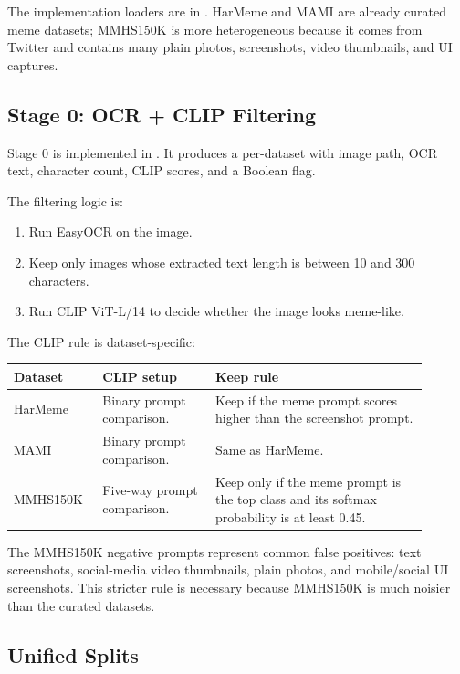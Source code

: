 \documentclass[11pt,a4paper]{article}
\newcommand{\code}[1]{\texttt{\detokenize{#1}}}
\begin{document}
The implementation loaders are in . HarMeme and MAMI are already curated meme datasets; MMHS150K is more heterogeneous because it comes from Twitter and contains many plain photos, screenshots, video thumbnails, and UI captures.

\subsection{Stage 0: OCR + CLIP Filtering}

Stage 0 is implemented in . It produces a per-dataset \code{manifest.csv} with image path, OCR text, character count, CLIP scores, and a Boolean \code{kept} flag.

The filtering logic is:

\begin{enumerate}
  \item Run EasyOCR on the image.
  \item Keep only images whose extracted text length is between 10 and 300 characters.
  \item Run CLIP ViT-L/14 to decide whether the image looks meme-like.
\end{enumerate}

The CLIP rule is dataset-specific:

\begin{longtable}{p{0.18\linewidth}p{0.25\linewidth}p{0.47\linewidth}}
\toprule
\textbf{Dataset} & \textbf{CLIP setup} & \textbf{Keep rule}\\
\midrule
HarMeme & Binary prompt comparison. & Keep if the meme prompt scores higher than the screenshot prompt.\\
MAMI & Binary prompt comparison. & Same as HarMeme.\\
MMHS150K & Five-way prompt comparison. & Keep only if the meme prompt is the top class and its softmax probability is at least 0.45.\\
\bottomrule
\end{longtable}

The MMHS150K negative prompts represent common false positives: text screenshots, social-media video thumbnails, plain photos, and mobile/social UI screenshots. This stricter rule is necessary because MMHS150K is much noisier than the curated datasets.

\subsection{Unified Splits}
\end{document}
